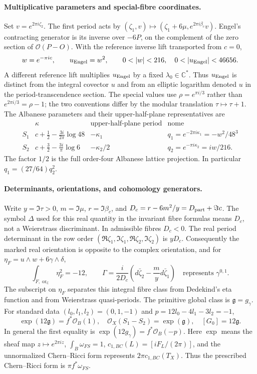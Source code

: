 \paragraph{Multiplicative parameters and special-fibre coordinates.}
Set $v=e^{2\pi i\zeta_2}$. The first period acts by
$(\zeta_1,v)\mapsto(\zeta_1+6\mu,e^{2\pi i\beta_c}v)$.
Engel's contracting generator is its inverse over $-6P$, on the
complement of the zero section of $\mathcal O(P-O)$.
With the reference inverse lift transported from $c=0$,
\[
 w=e^{-\pi ic},\qquad u_{\rm Engel}=w^2,
 \qquad 0<|w|<216,\quad 0<|u_{\rm Engel}|<46656.
\]
A different reference lift multiplies $u_{\rm Engel}$ by a fixed
$\lambda_0\in\mathbb C^*$. Thus $u_{\rm Engel}$ is distinct from
the integral covector $u$ and from an elliptic logarithm denoted $u$
in the period-transcendence section.
The special values use $\rho=e^{\pi i/3}$ rather than
$e^{2\pi i/3}=\rho-1$; the two conventions differ by the modular
translation $\tau\mapsto\tau+1$. The Albanese parameters and their
upper-half-plane representatives are
\[
 \begin{array}{c|c|c|c}
 &\kappa&\text{upper-half-plane period}&\text{nome}\\\hline
 S_1&c+\frac12-\frac{3i}{2\pi}\log48&-\kappa_1&
             q_1=e^{-2\pi i\kappa_1}=-w^2/48^3\\
 S_2&c+\frac32-\frac{3i}{\pi}\log6&-\kappa_2/2&
             q_2=e^{-\pi i\kappa_2}=iw/216.
 \end{array}
\]
The factor $1/2$ is the full order-four Albanese lattice projection.
In particular $q_1=(27/64)q_2^2$.

\paragraph{Determinants, orientations, and cohomology generators.}
Write $y=\Im\tau>0$, $m=\Im\mu$, $r=\Im\beta_c$, and
$D_c=r-6m^2/y=D_{\rm part}+\Im c$. The symbol $\Delta$ used
for this real quantity in the invariant fibre formulas means $D_c$,
not a Weierstrass discriminant. In admissible fibres $D_c<0$.
The real period determinant in the row order
$(\Re\zeta_1,\Im\zeta_1,\Re\zeta_2,\Im\zeta_2)$ is $yD_c$.
Consequently the marked real orientation is opposite to the complex
orientation, and for
$\eta_F=u\wedge w+6\gamma\wedge\delta$,
\[
 \int_{F,\operatorname{or}_{\mathbb C}}\eta_F^2=-12,
 \qquad
 \Gamma=\frac{i}{2D_c}
       \left(d\bar\zeta_2-\frac myd\bar\zeta_1\right)
       \quad\text{represents }\gamma^{0,1}.
\]
The subscript on $\eta_F$ separates this integral fibre class from
Dedekind's eta function and from Weierstrass quasi-periods.
The primitive global class is $\mathfrak g=g_\gamma$.
For standard data $(l_0,l_1,l_2)=(0,1,-1)$ and
$p=12l_0-4l_1-3l_2=-1$,
\[
 \exp(12\mathfrak g)=f^*\mathcal O_B(1),\quad
 \mathcal O_X(S_1-S_2)=\exp(\mathfrak g),\quad
 [G_0]=12\mathfrak g.
\]
In general the first equality is
$\exp(12g_\gamma)=f^*\mathcal O_B(-p)$.
Here $\exp$ means the sheaf map $z\mapsto e^{2\pi iz}$,
$\int_B\omega_{FS}=1$, $c_{1,BC}(L)=[iF_L/(2\pi)]$, and the
unnormalized Chern--Ricci form represents $2\pi c_{1,BC}(T_X)$.
Thus the prescribed Chern--Ricci form is $\pi f^*\omega_{FS}$.

